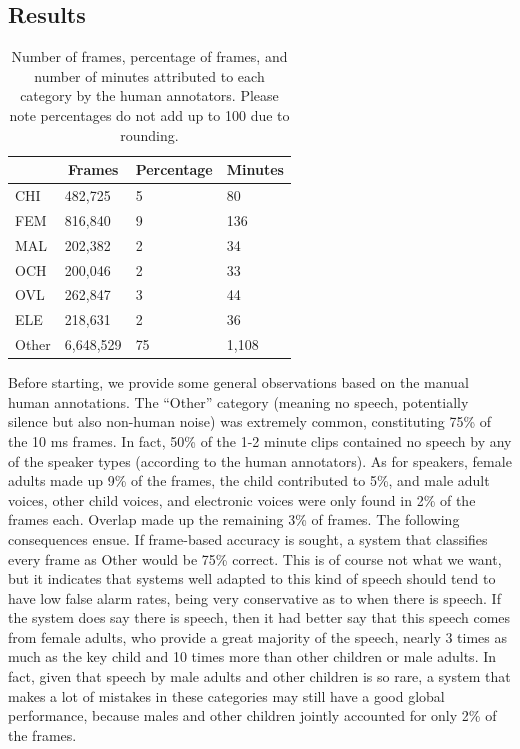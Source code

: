 \documentclass[english,table,man,floatsintext]{apa6}
\begin{document}
\hypertarget{results}{%
\subsection{Results}\label{results}}

\begin{table}[tbp]

\begin{center}
\begin{threeparttable}

\caption{\label{tab:tabprops}Number of frames, percentage of frames, and number of minutes attributed to each category by the human annotators. Please note percentages do not add up to 100 due to rounding.}

\begin{tabular}{llll}
\toprule
 & \multicolumn{1}{c}{Frames} & \multicolumn{1}{c}{Percentage} & \multicolumn{1}{c}{Minutes}\\
\midrule
CHI & 482,725 & 5 & 80\\
FEM & 816,840 & 9 & 136\\
MAL & 202,382 & 2 & 34\\
OCH & 200,046 & 2 & 33\\
OVL & 262,847 & 3 & 44\\
ELE & 218,631 & 2 & 36\\
Other & 6,648,529 & 75 & 1,108\\
\bottomrule
\end{tabular}

\end{threeparttable}
\end{center}

\end{table}

Before starting, we provide some general observations based on the manual human annotations. The \enquote{Other} category (meaning no speech, potentially silence but also non-human noise) was extremely common, constituting 75\% of the 10 ms frames. In fact, 50\% of the 1-2 minute clips contained no speech by any of the speaker types (according to the human annotators). As for speakers, female adults made up 9\% of the frames, the child contributed to 5\%, and male adult voices, other child voices, and electronic voices were only found in 2\% of the frames each. Overlap made up the remaining 3\% of frames. The following consequences ensue. If frame-based accuracy is sought, a system that classifies every frame as Other would be 75\% correct. This is of course not what we want, but it indicates that systems well adapted to this kind of speech should tend to have low false alarm rates, being very conservative as to when there is speech. If the system does say there is speech, then it had better say that this speech comes from female adults, who provide a great majority of the speech, nearly 3 times as much as the key child and 10 times more than other children or male adults. In fact, given that speech by male adults and other children is so rare, a system that makes a lot of mistakes in these categories may still have a good global performance, because males and other children jointly accounted for only 2\% of the frames.
\end{document}
